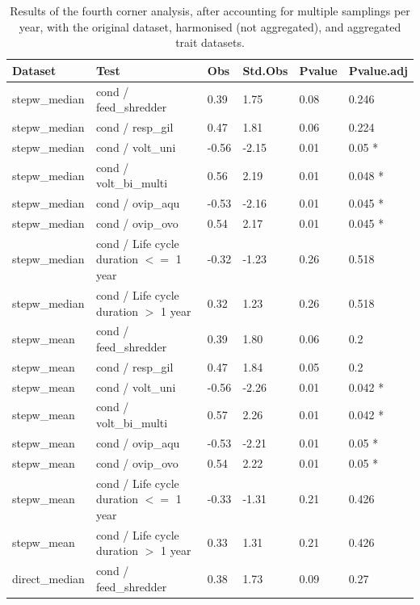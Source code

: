 \documentclass[12pt]{article}
\begin{document}
\newpage

\begin{longtable}[H]{m{2.6cm}|m{7.3cm}|m{1cm}|m{1.4cm}|m{1.5cm}|m{1.5cm}}
    \caption{Results of the fourth corner analysis, after accounting for multiple samplings per year, with the original dataset, harmonised (not aggregated), and aggregated trait datasets.}
    \label{stab:fc_selected_reduced}
    \endfirsthead
    \toprule[.1em]
    Dataset & Test & Obs & Std.Obs & Pvalue & Pvalue.adj \\ 
    \toprule[.1em]
      stepw\_median & cond / feed\_shredder & 0.39 & 1.75 & 0.08 & 0.246 \\ 
      stepw\_median & cond / resp\_gil & 0.47 & 1.81 & 0.06 & 0.224 \\ 
      stepw\_median & cond / volt\_uni & -0.56 & -2.15 & 0.01 & 0.05 * \\ 
      stepw\_median & cond / volt\_bi\_multi & 0.56 & 2.19 & 0.01 & 0.048 * \\ 
      stepw\_median & cond / ovip\_aqu & -0.53 & -2.16 & 0.01 & 0.045 * \\ 
      stepw\_median & cond / ovip\_ovo & 0.54 & 2.17 & 0.01 & 0.045 * \\ 
      stepw\_median & cond / Life cycle duration $<=$ 1 year & -0.32 & -1.23 & 0.26 & 0.518 \\ 
      stepw\_median & cond / Life cycle duration $>$ 1 year & 0.32 & 1.23 & 0.26 & 0.518 \\
      \midrule 
      stepw\_mean & cond / feed\_shredder & 0.39 & 1.80 & 0.06 & 0.2 \\ 
      stepw\_mean & cond / resp\_gil & 0.47 & 1.84 & 0.05 & 0.2 \\ 
      stepw\_mean & cond / volt\_uni & -0.56 & -2.26 & 0.01 & 0.042 * \\ 
      stepw\_mean & cond / volt\_bi\_multi & 0.57 & 2.26 & 0.01 & 0.042 * \\ 
      stepw\_mean & cond / ovip\_aqu & -0.53 & -2.21 & 0.01 & 0.05 * \\ 
      stepw\_mean & cond / ovip\_ovo & 0.54 & 2.22 & 0.01 & 0.05 * \\ 
      stepw\_mean & cond / Life cycle duration $<=$ 1 year & -0.33 & -1.31 & 0.21 & 0.426 \\ 
      stepw\_mean & cond / Life cycle duration $>$ 1 year & 0.33 & 1.31 & 0.21 & 0.426 \\ 
      \midrule
      direct\_median & cond / feed\_shredder & 0.38 & 1.73 & 0.09 & 0.27 \\ 

\end{longtable}
\end{document}
